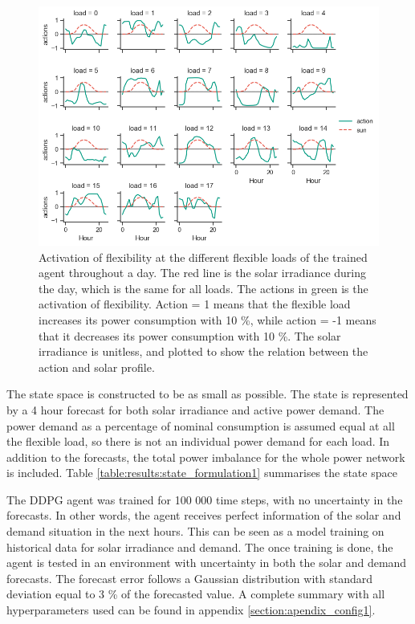 \documentclass[class=book, crop=false, 11pt]{standalone}
\begin{document}
\begin{figure}[h]
    \center
    \includegraphics[scale=0.7]{figures/configuration1.png}
    \caption[size = 9]{Activation of flexibility at the different flexible loads of the trained agent throughout a day. The red line is the solar irradiance during the day, which is the same for all loads. The actions in green is the activation of flexibility. Action = 1 means that the flexible load increases its power consumption with 10 \%, while action = -1 means that it decreases its power consumption with 10 \%. The solar irradiance is unitless, and plotted to show the relation between the action and solar profile.}
    \label{fig:results:configuration1}
\end{figure}

The state space is constructed to be as small as possible. The state is represented by a 4 hour forecast for both solar irradiance and active power demand. The power demand as a percentage of nominal consumption is assumed equal at all the flexible load, so there is not an individual power demand for each load. In addition to the forecasts, the total power imbalance for the whole power network is included. Table \ref{table:results:state_formulation1} summarises the state space

The DDPG agent was trained for 100 000 time steps, with no uncertainty in the forecasts. In other words, the agent receives perfect information of the solar and demand situation in the next hours. This can be seen as a model training on historical data for solar irradiance and demand. The once training is done, the agent is tested in an environment with uncertainty in both the solar and demand forecasts. The forecast error follows a Gaussian distribution with standard deviation equal to 3 \% of the forecasted value. A complete summary with all hyperparameters used can be found in appendix \ref{section:apendix_config1}.
\end{document}
